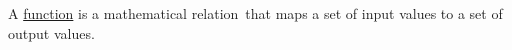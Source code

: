 \documentclass[preview]{standalone}
\begin{document}
\begin{center}
A \underline{function} is a mathematical relation\
        that maps a set of input values to a set of output values.
\end{center}
\end{document}
